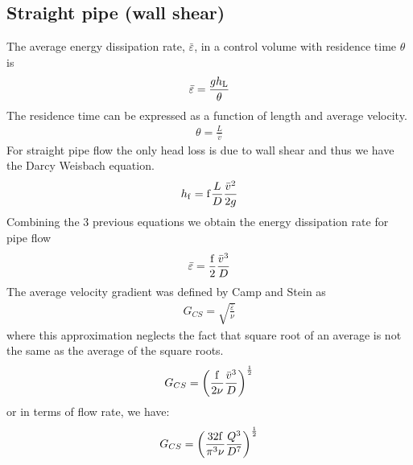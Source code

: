 \documentclass[letterpaper,10pt,english]{sphinxmanual}
\begin{document}
\subsection{Straight pipe (wall shear)}
\label{\detokenize{Rapid_Mix/RM_Derivations:straight-pipe-wall-shear}}\label{\detokenize{Rapid_Mix/RM_Derivations:heading-straight-pipe-wall-shear}}
The average energy dissipation rate, \(\bar\varepsilon\), in a control volume with residence time \(\theta\) is
\begin{equation}\label{equation:Rapid_Mix/RM_Derivations:eq_EDR_straight_pipe}
\begin{split} \bar\varepsilon = \frac{gh_{\rm{L}}}{\theta}\end{split}
\end{equation}
The residence time can be expressed as a function of length and average velocity.
\begin{equation}\label{equation:Rapid_Mix/RM_Derivations:Rapid_Mix/RM_Derivations:49}
\begin{split}\theta = \frac{L}{\bar v}\end{split}
\end{equation}
For straight pipe flow the only head loss is due to wall shear and thus we have the Darcy Weisbach equation.
\begin{equation}\label{equation:Rapid_Mix/RM_Derivations:Rapid_Mix/RM_Derivations:50}
\begin{split}h_{{\rm f}} = {{\rm f}} \frac{L}{D} \frac{\bar v^2}{2g}\end{split}
\end{equation}
Combining the 3 previous equations we obtain the energy dissipation rate for pipe flow
\begin{equation}\label{equation:Rapid_Mix/RM_Derivations:Rapid_Mix/RM_Derivations:51}
\begin{split}\bar\varepsilon = \frac{{\rm f}}{2} \frac{\bar v^3}{D}\end{split}
\end{equation}
The average velocity gradient was defined by Camp and Stein as
\begin{equation}\label{equation:Rapid_Mix/RM_Derivations:Rapid_Mix/RM_Derivations:52}
\begin{split}G_{CS} = \sqrt{\frac{\bar \varepsilon}{\nu}}\end{split}
\end{equation}
where this approximation neglects the fact that square root of an average is not the same as the average of the square roots.
\begin{equation}\label{equation:Rapid_Mix/RM_Derivations:Rapid_Mix/RM_Derivations:53}
\begin{split}G_{CS} = \left(\frac{{\rm f}}{2\nu} \frac{\bar v^3}{D} \right)^\frac{1}{2}\end{split}
\end{equation}
or in terms of flow rate, we have:
\begin{equation}\label{equation:Rapid_Mix/RM_Derivations:Rapid_Mix/RM_Derivations:54}
\begin{split}G_{CS} = \left(\frac{\rm{32f}}{ \pi^3\nu} \frac{Q^3}{D^7} \right)^\frac{1}{2}\end{split}
\end{equation}
\end{document}
